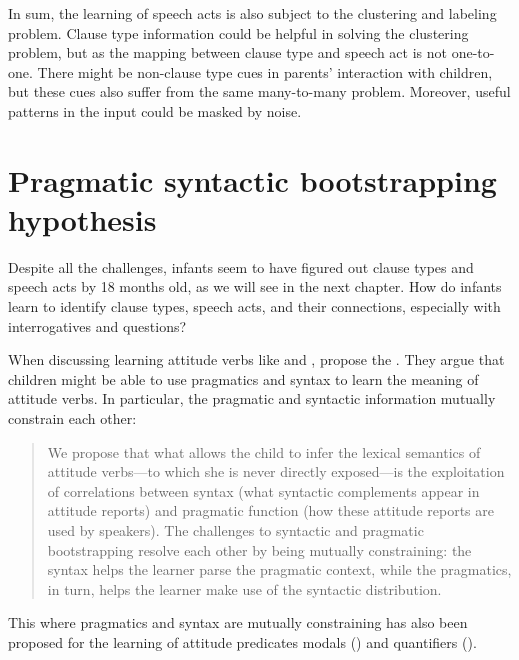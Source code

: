 In sum, the learning of speech acts is also subject to the clustering and labeling problem. Clause type information could be helpful in solving the clustering problem, but as the mapping between clause type and speech act is not one-to-one. There might be non-clause type cues in parents' interaction with children, but these cues also suffer from the same many-to-many problem. Moreover, useful patterns in the input could be masked by noise. %



\section{Pragmatic syntactic bootstrapping hypothesis}
\label{sec:intro:prag-syn-bootstrap}
Despite all the challenges, infants seem to have figured out clause types and speech acts by 18 months old, as we will see in the next chapter. How do infants learn to identify clause types, speech acts, and their connections, especially with interrogatives and questions?

When discussing learning attitude verbs like  and , \textcite{hacquardlidz2018} propose the \hypos{}. They argue that children might be able to use pragmatics and syntax to learn the meaning of attitude verbs. In particular, the pragmatic and syntactic information mutually constrain each other:

\begin{quote}
We propose that what allows the child to infer the lexical semantics of attitude verbs—to which she is never directly exposed—is the exploitation of correlations between syntax (what syntactic complements appear in attitude reports) and pragmatic function (how these attitude reports are used by speakers). The challenges to syntactic and pragmatic bootstrapping resolve each other by being mutually constraining: the syntax helps the learner parse the pragmatic context, while the pragmatics, in turn, helps the learner make use of the syntactic distribution. 

\hspace*{\fill}\hfill \textcite[p.4-5]{hacquardlidz2018}
\end{quote}


This \hypos{} where pragmatics and syntax are mutually constraining has also been proposed for the learning of attitude predicates modals (\citealt{dieuleveut2021}) and quantifiers (\citealt{knowlton2021}). 

